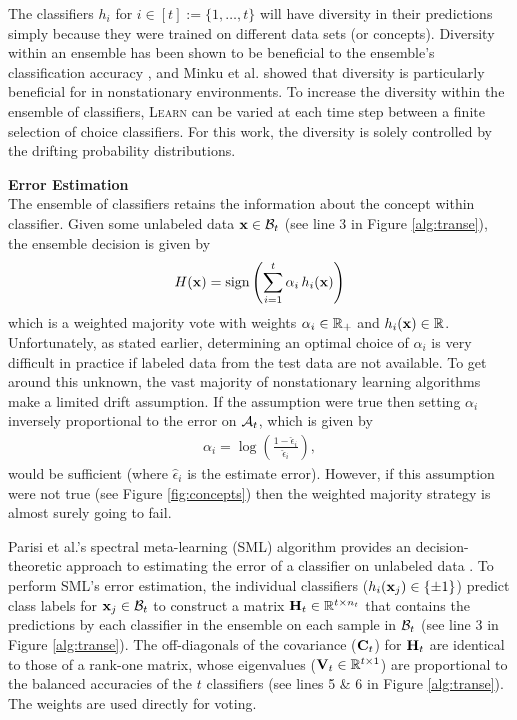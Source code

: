\documentclass[10pt, conference]{IEEEtran}
\begin{document}
The classifiers $h_i$ for $i\in[t]:=\{1,\ldots,t\}$ will have diversity in their predictions simply because they were trained on different data sets (or concepts). Diversity within an ensemble has been shown to be beneficial to the ensemble's classification accuracy \cite{Kuncheva2004Book}, and Minku et al. showed that diversity is particularly beneficial for in nonstationary environments.  
To increase the diversity within the ensemble of classifiers, \textsc{Learn} can be varied at each time step between a finite selection of choice classifiers. For this work, the diversity is solely controlled by the drifting probability distributions. 
\vspace{.5em}

{\bf\noindent Error Estimation}\\
The ensemble of classifiers retains the information about the concept within classifier. Given some unlabeled data ${\mathbf x} \in {\mathcal B}_t$ (see line 3 in Figure \ref{alg:transe}), the ensemble decision is given by 
\begin{align}
H({\mathbf x}) = \textrm{sign}\left(\sum_{i=1}^{t} \alpha_i\,h_i({\mathbf x})\right)
\end{align}
\noindent which is a weighted majority vote with weights $\alpha_i \in {\mathbb R}_{+}$ and $h_i({\mathbf x}) \in {\mathbb R}$. Unfortunately, as stated earlier,  determining an optimal choice of $\alpha_i$ is very difficult in practice if labeled data from the test data are not available.  To get around this unknown, the vast majority of nonstationary learning algorithms make a limited drift assumption. If the assumption were true then setting $\alpha_i$ inversely proportional to the error on ${\mathcal A}_t$, which is given by 
\begin{align}
\alpha_i = \log\left(\frac{1 - \widehat{\epsilon}_i}{\widehat{\epsilon}_i}\right), \nonumber
\end{align}
would be sufficient (where $\widehat{\epsilon}_i$ is the estimate error). However, if this assumption were not true (see Figure \ref{fig:concepts}) then the weighted majority strategy is almost surely going to fail. 


Parisi et al.'s spectral meta-learning (SML) algorithm provides an decision-theoretic approach to estimating the error of a classifier on unlabeled data \cite{Parisi2014PNAS}. 
To perform SML's error estimation, the individual classifiers ($h_i({\mathbf x}_j)\in\{\pm1\}$) predict class labels for ${\mathbf x}_j\in{\mathcal B}_t$ to construct a matrix ${\mathbf H}_t \in {\mathbb R}^{t \times n_t}$ that contains the predictions by each classifier in the ensemble on each sample in ${\mathcal B}_t$ (see line 3 in Figure \ref{alg:transe}). The off-diagonals of the covariance (${\mathbf C}_t$) for ${\mathbf H}_t$ are identical to those of a rank-one matrix, whose eigenvalues (${\mathbf V}_t \in{\mathbb R}^{t \times 1}$) are proportional to the balanced accuracies of the $t$ classifiers (see lines 5 \& 6 in Figure \ref{alg:transe}). The weights are used directly for voting. 
\end{document}
